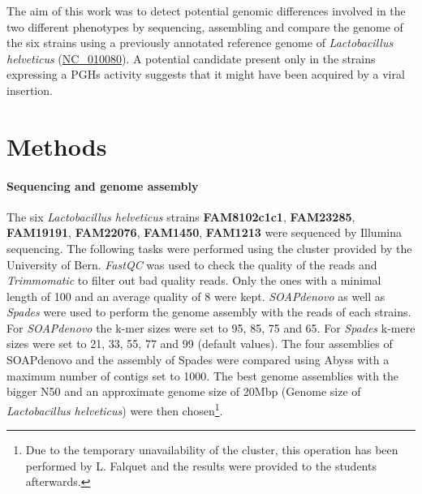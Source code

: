 \documentclass[10pt,a4paper]{article}
\begin{document}
\noindent The aim of this work was to detect potential genomic differences involved in the two different phenotypes by sequencing, assembling and compare the genome of the six strains using a previously annotated reference genome of \textit{Lactobacillus helveticus} (\href{https://www.ncbi.nlm.nih.gov/genome/?term=NC_010080}{NC\_010080}). A potential candidate present only in the strains expressing a PGHs activity suggests that it might have been acquired by a viral insertion. 


\section*{Methods}

\paragraph{Sequencing and genome assembly}
The six \textit{Lactobacillus helveticus} strains \textbf{FAM8102c1c1}, \textbf{FAM23285}, \textbf{FAM19191}, \textbf{FAM22076}, \textbf{FAM1450}, \textbf{FAM1213}  were sequenced by Illumina sequencing. The following tasks were performed using the cluster provided by the University of Bern.  \textit{FastQC}\cite{andrews2012} was used to check the quality of the reads and \textit{Trimmomatic}\cite{bolger_trimmomatic:_2014} to filter out bad quality reads. Only the ones with a minimal length of 100 and an average quality of 8 were kept. \textit{SOAPdenovo} as well as \textit{Spades} were used to perform the genome assembly with the reads of each strains. For \textit{SOAPdenovo} the k-mer sizes were set to 95, 85, 75 and 65. For \textit{Spades} k-mere sizes were set to 21, 33, 55, 77 and 99 (default values). The four assemblies of SOAPdenovo and the assembly of Spades were compared using Abyss with a maximum number of contigs set to 1000. The best genome assemblies with the bigger N50 and an approximate genome size of 20Mbp (Genome size of \textit{Lactobacillus helveticus}) were then chosen\footnote{Due to the temporary unavailability of the cluster, this operation has been performed by L. Falquet and the results were provided to the students afterwards.}.
\end{document}
